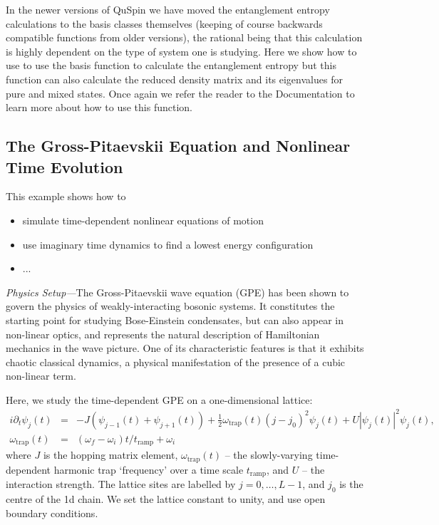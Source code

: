 \documentclass{SciPost}
\newcommand\0{\scalebox{-1}[1]{0}}
\newcommand{\BHLcode}{example8.py}
\begin{document}

In the newer versions of QuSpin we have moved the entanglement entropy calculations to the basis classes themselves (keeping of course backwards compatible functions from older versions), the rational being that this calculation is highly dependent on the type of system one is studying. Here we show how to use to use the basis function to calculate the entanglement entropy but this function can also calculate the reduced density matrix and its eigenvalues for pure and mixed states. Once again we refer the reader to the Documentation to learn more about how to use this function. 




\subsection{The Gross-Pitaevskii Equation and Nonlinear Time Evolution}
\label{subsec:GP_dynamics}

This example shows how to
\begin{itemize}
	\item simulate time-dependent nonlinear equations of motion
	\item use imaginary time dynamics to find a lowest energy configuration
	\item ...
\end{itemize}

\noindent\emph{Physics Setup---}The Gross-Pitaevskii wave equation (GPE) has been shown to govern the physics of weakly-interacting bosonic systems. It constitutes the starting point for studying Bose-Einstein condensates, but can also appear in non-linear optics, and represents the natural description of Hamiltonian mechanics in the wave picture. One of its characteristic features is that it exhibits chaotic classical dynamics, a physical manifestation of the presence of a cubic non-linear term.

Here, we study the time-dependent GPE on a one-dimensional lattice:
\begin{eqnarray}
i\partial_t\psi_j(t) &=& -J\left( \psi_{j-1}(t) + \psi_{j+1}(t)\right) + \frac{1}{2}\omega_\mathrm{trap}(t)(j-j_0)^2\psi_j(t) + U|\psi_j(t)|^2\psi_j(t), \nonumber \\
\omega_\mathrm{trap}(t)&=&(\omega_f-\omega_i)t/t_\mathrm{ramp}+ \omega_i
\label{eq:GPE}
\end{eqnarray}
where $J$ is the hopping matrix element, $\omega_\mathrm{trap}(t)$ -- the slowly-varying time-dependent harmonic trap `frequency' over a time scale $t_\mathrm{ramp}$, and $U$ -- the interaction strength. The lattice sites are labelled by $j=0,\dots,L-1$, and $j_0$ is the centre of the 1d chain. We set the lattice constant to unity, and use open boundary conditions.
\end{document}
